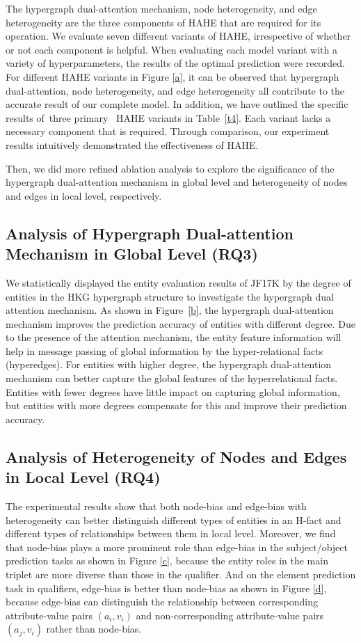 \documentclass[11pt]{article}
\begin{document}
The hypergraph dual-attention mechanism, node heterogeneity, and edge heterogeneity are the three components of HAHE that are required for its operation. We evaluate seven different variants of HAHE, irrespective of whether or not each component is helpful. When evaluating each model variant with a variety of hyperparameters, the results of the optimal prediction were recorded. For different HAHE variants in Figure \ref{a}, it can be observed that hypergraph dual-attention, node heterogeneity, and edge heterogeneity all contribute to the accurate result of our complete model. In addition, we have outlined the specific results of three primary  HAHE variants in Table~\ref{t4}. Each variant lacks a necessary component that is required. Through comparison, our experiment results intuitively demonstrated the effectiveness of HAHE.

Then, we did more refined ablation analysis to explore the significance of the hypergraph dual-attention mechanism in global level and heterogeneity of nodes and edges in local level, respectively.

\subsection{Analysis of Hypergraph Dual-attention Mechanism in Global Level (RQ3)}

We statistically displayed the entity evaluation results of JF17K by the degree of entities in the HKG hypergraph structure to investigate the hypergraph dual attention mechanism. As shown in Figure~\ref{b}, the hypergraph dual-attention mechanism improves the prediction accuracy of entities with different degree. Due to the presence of the attention mechanism, the entity feature information will help in message passing of global information by the hyper-relational facts (hyperedges). For entities with higher degree, the hypergraph dual-attention mechanism can better capture the global features of the hyperrelational facts. Entities with fewer degrees have little impact on capturing global information, but entities with more degrees compensate for this and improve their prediction accuracy.


\subsection{Analysis of Heterogeneity of Nodes and Edges in Local Level (RQ4)}

The experimental results show that both node-bias and edge-bias with heterogeneity can better distinguish different types of entities in an H-fact and different types of relationships between them in local level. Moreover, we find that node-bias plays a more prominent role than edge-bias in the subject/object prediction tasks as shown in Figure \ref{c}, because the entity roles in the main triplet are more diverse than those in the qualifier. And on the element prediction task in qualifiers, edge-bias is better than node-bias as shown in Figure \ref{d}, because edge-bias can distinguish the relationship between corresponding attribute-value pairs $(a_i, v_i)$ and non-corresponding attribute-value pairs $(a_ j, v_i)$ rather than node-bias.
\end{document}
